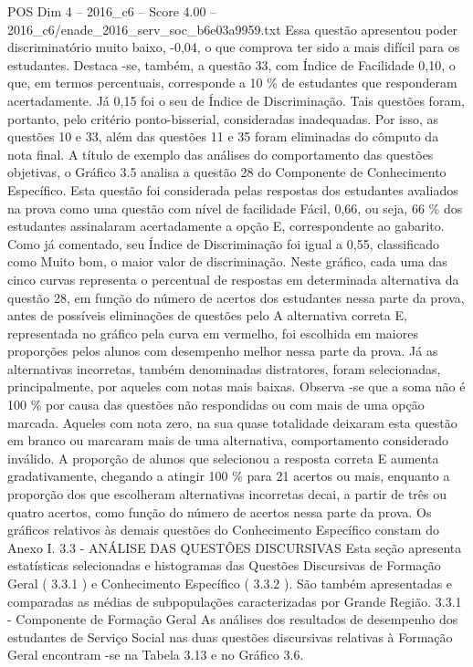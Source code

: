 \begin{textsample}{POS Dim 4 – 2016\_c6 – Score 4.00 – 2016\_c6/enade\_2016\_serv\_soc\_b6e03a9959.txt}
Essa questão apresentou poder discriminatório muito baixo, -0,04, o que comprova ter sido a mais difícil para os estudantes.
Destaca -se, também, a questão 33, com Índice de Facilidade 0,10, o que, em termos percentuais, corresponde a 10 \% de estudantes que responderam acertadamente.
Já 0,15 foi o seu de Índice de Discriminação.
Tais questões foram, portanto, pelo critério ponto-bisserial, consideradas inadequadas.
Por isso, as questões 10 e 33, além das questões 11 e 35 foram eliminadas do cômputo da nota final.
A título de exemplo das análises do comportamento das questões objetivas, o Gráfico 3.5 analisa a questão 28 do Componente de Conhecimento Específico.
Esta questão foi considerada pelas respostas dos estudantes avaliados na prova como uma questão com nível de facilidade Fácil, 0,66, ou seja, 66 \% dos estudantes assinalaram acertadamente a opção E, correspondente ao gabarito.
Como já comentado, seu Índice de Discriminação foi igual a 0,55, classificado como Muito bom, o maior valor de discriminação.
Neste gráfico, cada uma das cinco curvas representa o percentual de respostas em determinada alternativa da questão 28, em função do número de acertos dos estudantes nessa parte da prova, antes de possíveis eliminações de questões pelo A alternativa correta E, representada no gráfico pela curva em vermelho, foi escolhida em maiores proporções pelos alunos com desempenho melhor nessa parte da prova.
Já as alternativas incorretas, também denominadas distratores, foram selecionadas, principalmente, por aqueles com notas mais baixas.
Observa -se que a soma não é 100 \% por causa das questões não respondidas ou com mais de uma opção marcada.
Aqueles com nota zero, na sua quase totalidade deixaram esta questão em branco ou marcaram mais de uma alternativa, comportamento considerado inválido.
A proporção de alunos que selecionou a resposta correta E aumenta gradativamente, chegando a atingir 100 \% para 21 acertos ou mais, enquanto a proporção dos que escolheram alternativas incorretas decai, a partir de três ou quatro acertos, como função do número de acertos nessa parte da prova.
Os gráficos relativos às demais questões do Conhecimento Específico constam do Anexo I. 3.3 - ANÁLISE DAS QUESTÕES DISCURSIVAS Esta seção apresenta estatísticas selecionadas e histogramas das Questões Discursivas de Formação Geral ( 3.3.1 ) e Conhecimento Específico ( 3.3.2 ).
São também apresentadas e comparadas as médias de subpopulações caracterizadas por Grande Região. 3.3.1 - Componente de Formação Geral As análises dos resultados de desempenho dos estudantes de Serviço Social nas duas questões discursivas relativas à Formação Geral encontram -se na Tabela 3.13 e no Gráfico 3.6.

\end{textsample}

